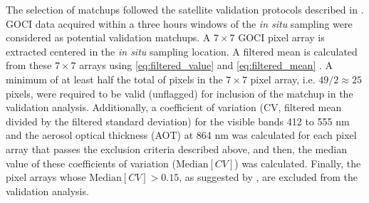 \documentclass[onecolumn,3p,letterpaper,11pt]{elsarticle}
\begin{document}
The selection of matchups followed the satellite validation protocols described in \citet{Bailey2006}. GOCI data acquired within a three hours windows of the {\it in situ} sampling were considered as potential validation matchups. A $7\times7$ GOCI pixel array is extracted centered in the {\it in situ} sampling location. A filtered mean is calculated from these $7\times7$ arrays using \autoref{eq:filtered_value} and \autoref{eq:filtered_mean} \citep{Bailey2006}. A minimum of at least half the total of pixels in the $7\times7$ pixel array, i.e. $49/2\approx25$ pixels, were required to be valid (unflagged) for inclusion of the matchup in the validation analysis. Additionally, a coefficient of variation (CV, filtered mean divided by the filtered standard deviation) for the visible bands 412 to 555 nm and the aerosol optical thickness (AOT) at 864 nm was calculated for each pixel array that passes the exclusion criteria described above, and then, the median value of these coefficients of variation ($\text{Median}[CV]$) was calculated. Finally, the pixel arrays whose $\text{Median}[CV]>0.15$, as suggested by \citep{Bailey2006}, are excluded from the validation analysis.
\end{document}
